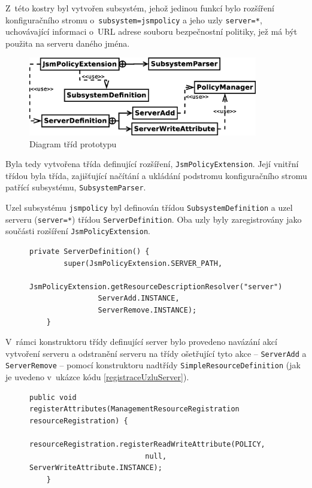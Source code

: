 Z~této kostry byl vytvořen subsystém, jehož jedinou funkcí bylo rozšíření konfiguračního stromu o~{\tt subsystem=jsmpolicy} a jeho uzly {\tt server=*}, uchovávající informaci o~URL adrese souboru bezpečnostní politiky, jež má být použita na serveru daného jména.

\begin{figure}[ht]
  \centering
  \includegraphics[width=10cm]{fig/tridy1}
  \caption{Diagram tříd prototypu}
  \label{tridy1}
\end{figure}

Byla tedy vytvořena třída definující rozšíření, {\tt JsmPolicyExtension}.
Její vnitřní třídou byla třída, zajišťující načítání a ukládání podstromu konfiguračního stromu patřící subsystému, {\tt SubsystemParser}.

Uzel subsystému {\tt jsmpolicy} byl definován třídou {\tt SubsystemDefinition} a uzel serveru ({\tt server=*}) třídou {\tt ServerDefinition}.
Oba uzly byly zaregistrovány jako součásti rozšíření {\tt JsmPolicyExtension}.

\begin{figure}[tbh]
\begin{lstlisting}[caption=Konstruktor třídy {\tt ServerDefinition} definující konfigurační uzel server, label=registraceUzluServer]
    private ServerDefinition() {
        super(JsmPolicyExtension.SERVER_PATH,
                JsmPolicyExtension.getResourceDescriptionResolver("server"),
                ServerAdd.INSTANCE,
                ServerRemove.INSTANCE);
    }
\end{lstlisting}
\end{figure}

V~rámci konstruktoru třídy definující server bylo provedeno navázání akcí vytvoření serveru a odstranění serveru na třídy ošetřující tyto akce -- {\tt ServerAdd} a {\tt ServerRemove} -- pomocí konstruktoru nadtřídy {\tt SimpleResourceDefinition} (jak je uvedeno v~ukázce kódu \ref{registraceUzluServer}).

\begin{figure}[tbh]
\begin{lstlisting}[caption=Registrace konfigurační vlastnosti {\tt policy} uzlu {\tt server=*}, label=registraceAtributu]
    public void registerAttributes(ManagementResourceRegistration resourceRegistration) {
            resourceRegistration.registerReadWriteAttribute(POLICY,
                           null, ServerWriteAttribute.INSTANCE);
    }
\end{lstlisting}
\end{figure}

